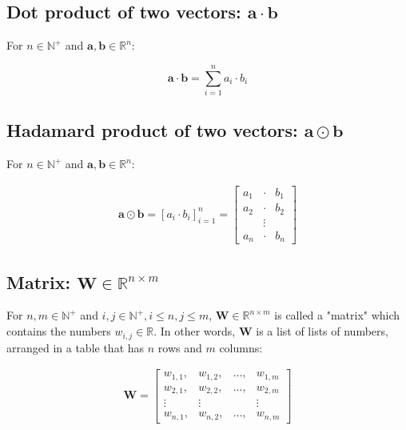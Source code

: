 \documentclass[titlepage]{article}
\begin{document}
      \subsection{Dot product of two vectors: $\mathbf{a} \cdot \mathbf{b}$}

        For $n \in \mathbb{N}^+$ and $\mathbf{a}, \mathbf{b} \in \mathbb{R}^n$:

        $$\mathbf{a} \cdot \mathbf{b} = \sum_{i=1}^n a_i \cdot b_i$$

      \subsection{%
        Hadamard product of two vectors: $\mathbf{a} \odot \mathbf{b}$
      }

        For $n \in \mathbb{N}^+$ and $\mathbf{a}, \mathbf{b} \in \mathbb{R}^n$:

        \begin{align*}
          \mathbf{a} \odot \mathbf{b}
            = \left[ a_i \cdot b_i \right]_{i=1}^n
            = \begin{bmatrix}
                a_1 & \cdot & b_1 \\
                a_2 & \cdot & b_2 \\
                & \vdots & \\
                a_n & \cdot & b_n
              \end{bmatrix}
        \end{align*}

      \subsection{Matrix: $\mathbf{W} \in \mathbb{R}^{n \times m}$}

        For $n, m \in \mathbb{N}^+$ and
        $i, j \in \mathbb{N}^+, i \leq n, j \leq m$,
        $\mathbf{W} \in \mathbb{R}^{n \times m}$ is called a "matrix" which
        contains the numbers $w_{i, j} \in \mathbb{R}$. In other words,
        $\mathbf{W}$ is a list of lists of numbers, arranged in a table that has
        $n$ rows and $m$ columns:

        \begin{align*}
          \mathbf{W}
            = \begin{bmatrix}
                w_{1,1}, & w_{1,2}, & \ldots, & w_{1,m} \\
                w_{2,1}, & w_{2,2}, & \ldots, & w_{2,m} \\
                \vdots & \vdots & & \vdots \\
                w_{n,1}, & w_{n,2}, & \ldots, & w_{n,m}
              \end{bmatrix}
        \end{align*}
\end{document}
